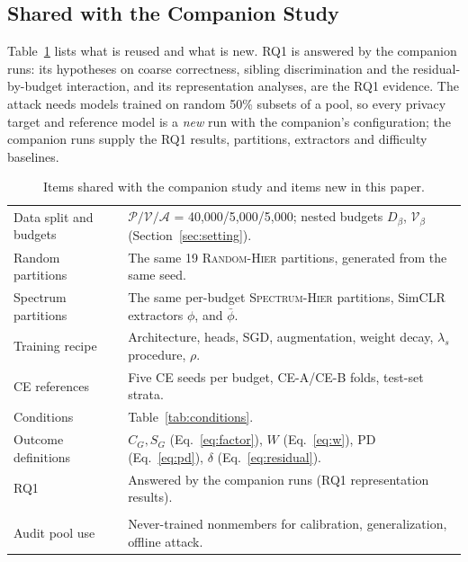 \documentclass{article} %
\newcommand{\cn}[1]{\textsc{#1}}
\newcommand{\pool}{\mathcal{P}}
\newcommand{\audit}{\mathcal{A}}
\newcommand{\valset}{\mathcal{V}}
\begin{document}
\subsection{Shared with the Companion Study}
\label{sec:shared}

Table~\ref{tab:shared} lists what is reused and what is new. RQ1 is answered by the companion runs: its hypotheses on coarse correctness, sibling discrimination and the residual-by-budget interaction, and its representation analyses, are the RQ1 evidence. The attack needs models trained on random 50\% subsets of a pool, so every privacy target and reference model is a \emph{new} run with the companion's configuration; the companion runs supply the RQ1 results, partitions, extractors and difficulty baselines.

\begin{table}[t]
\caption{Items shared with the companion study and items new in this paper.}
\label{tab:shared}
\begin{center}
\small
\begin{tabularx}{\linewidth}{@{}>{\raggedright\arraybackslash}p{3.3cm}>{\raggedright\arraybackslash}X@{}}
\toprule
\multicolumn{2}{@{}l}{\emph{Reused as is}} \\
\midrule
Data split and budgets & $\pool/\valset/\audit$ = 40,000/5,000/5,000; nested budgets $D_\beta$, $\valset_\beta$ (Section~\ref{sec:setting}). \\
Random partitions & The same 19 \cn{Random-Hier} partitions, generated from the same seed. \\
Spectrum partitions & The same per-budget \cn{Spectrum-Hier} partitions, SimCLR extractors $\phi$, and $\bar\phi$. \\
Training recipe & Architecture, heads, SGD, augmentation, weight decay, $\lambda_s$ procedure, $\rho$. \\
CE references & Five \cn{CE} seeds per budget, \cn{CE-A}/\cn{CE-B} folds, test-set strata. \\
Conditions & Table~\ref{tab:conditions}. \\
Outcome definitions & $C_G,S_G$ (Eq.~\ref{eq:factor}), $W$ (Eq.~\ref{eq:w}), PD (Eq.~\ref{eq:pd}), $\delta$ (Eq.~\ref{eq:residual}). \\
RQ1 & Answered by the companion runs (RQ1 representation results). \\
\midrule
\multicolumn{2}{@{}l}{\emph{New in this paper}} \\
\midrule
Audit pool use & Never-trained nonmembers for calibration, generalization, offline attack. \\

\end{tabularx}
\end{center}
\end{table}
\end{document}
